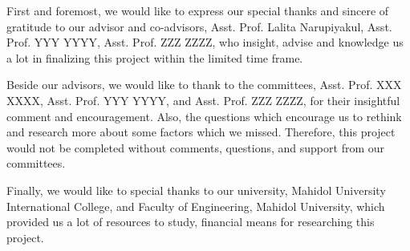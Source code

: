 First and foremost, we would like to express our special thanks and sincere of gratitude to our advisor and co-advisors, Asst. Prof. Lalita Narupiyakul, Asst. Prof. YYY YYYY, Asst. Prof. ZZZ ZZZZ, who insight, advise and knowledge us a lot in finalizing this project within the limited time frame.

Beside our advisors, we would like to thank to the committees, Asst. Prof. XXX XXXX, Asst. Prof. YYY YYYY, and Asst. Prof. ZZZ ZZZZ, for their insightful comment and encouragement. Also, the questions which encourage us to rethink and research more about some factors which we missed. Therefore, this project would not be completed without comments, questions, and support from our committees.

Finally, we would like to special thanks to our university, Mahidol University International College, and Faculty of Engineering, Mahidol University, which provided us a lot of resources to study, financial means for researching this project.